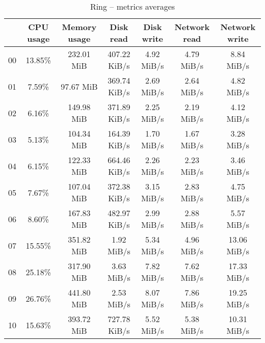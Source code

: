 \begin{table}[H]
\begin{center}
\caption{Ring -- metrics averages}
\label{tab:ring-avg}
\begin{tabular}{|c|c|c|c|c|c|c|}
\hline
   & CPU usage & Memory usage & Disk read & Disk write & Network read & Network write\\
\hline
00 & 13.85\% & 232.01 MiB & 407.22 KiB/s & 4.92 MiB/s & 4.79 MiB/s & 8.84 MiB/s\\
01 & 7.59\% & 97.67 MiB & 369.74 KiB/s & 2.69 MiB/s & 2.64 MiB/s & 4.82 MiB/s\\
02 & 6.16\% & 149.98 MiB & 371.89 KiB/s & 2.25 MiB/s & 2.19 MiB/s & 4.12 MiB/s\\
03 & 5.13\% & 104.34 MiB & 164.39 KiB/s & 1.70 MiB/s & 1.67 MiB/s & 3.28 MiB/s\\
04 & 6.15\% & 122.33 MiB & 664.46 KiB/s & 2.26 MiB/s & 2.23 MiB/s & 3.46 MiB/s\\
05 & 7.67\% & 107.04 MiB & 372.38 KiB/s & 3.15 MiB/s & 2.83 MiB/s & 4.75 MiB/s\\
06 & 8.60\% & 167.83 MiB & 482.97 KiB/s & 2.99 MiB/s & 2.88 MiB/s & 5.57 MiB/s\\
07 & 15.55\% & 351.82 MiB & 1.92 MiB/s & 5.34 MiB/s & 4.96 MiB/s & 13.06 MiB/s\\
08 & 25.18\% & 317.90 MiB & 3.63 MiB/s & 7.82 MiB/s & 7.62 MiB/s & 17.33 MiB/s\\
09 & 26.76\% & 441.80 MiB & 2.53 MiB/s & 8.07 MiB/s & 7.86 MiB/s & 19.25 MiB/s\\
10 & 15.63\% & 393.72 MiB & 727.78 KiB/s & 5.52 MiB/s & 5.38 MiB/s & 10.31 MiB/s\\
\hline
\end{tabular}
\end{center}
\end{table}
